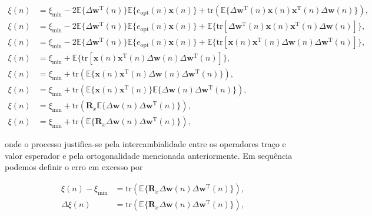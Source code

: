 \documentclass[a4paper,10pt]{article}
\begin{document}
\begin{enumerate}
\begin{enumerate}
						\begin{align}
							\xi(n) &= \xi_{\text{min}} - 2 \mathbb{E}\{\Delta \mathbf{w}^{\text{T}}(n)\} \mathbb{E}\{e_{\text{opt}}(n) \mathbf{x}(n)\} + \text{tr}(\mathbb{E}\{\Delta \mathbf{w}^{\text{T}}(n) \mathbf{x}(n) \mathbf{x}^{\text{T}}(n) \Delta \mathbf{w}(n)\}), \\
							\xi(n) &= \xi_{\text{min}} - 2 \mathbb{E}\{\Delta \mathbf{w}^{\text{T}}(n)\} \mathbb{E}\{e_{\text{opt}}(n)\mathbf{x}(n)\} + \mathbb{E}\{\text{tr}[\Delta \mathbf{w}^{\text{T}}(n) \mathbf{x}(n) \mathbf{x}^{\text{T}}(n) \Delta \mathbf{w}(n)]\}, \\
							\xi(n) &= \xi_{\text{min}} - 2 \mathbb{E}\{\Delta \mathbf{w}^{\text{T}}(n)\} \mathbb{E}\{e_{\text{opt}}(n)\mathbf{x}(n)\} + \mathbb{E}\{\text{tr}[\mathbf{x}(n) \mathbf{x}^{\text{T}}(n) \Delta \mathbf{w}(n) \Delta \mathbf{w}^{\text{T}}(n)]\}, \\
							\xi(n) &= \xi_{\text{min}} + \mathbb{E}\{\text{tr}[\mathbf{x}(n) \mathbf{x}^{\text{T}}(n) \Delta \mathbf{w}(n) \Delta \mathbf{w}^{\text{T}}(n)]\}, \\
							\xi(n) &= \xi_{\text{min}} + \text{tr}(\mathbb{E}\{\mathbf{x}(n) \mathbf{x}^{\text{T}}(n) \Delta \mathbf{w}(n) \Delta \mathbf{w}^{\text{T}}(n)\}), \\
							\xi(n) &= \xi_{\text{min}} + \text{tr}(\mathbb{E}\{\mathbf{x}(n) \mathbf{x}^{\text{T}}(n)\} \mathbb{E}\{\Delta \mathbf{w}(n) \Delta \mathbf{w}^{\text{T}}(n)\}), \\
							\xi(n) &= \xi_{\text{min}} + \text{tr}(\mathbf{R}_{x} \mathbb{E}\{\Delta \mathbf{w}(n) \Delta \mathbf{w}^{\text{T}}(n)\}), \\
							\xi(n) &= \xi_{\text{min}} + \text{tr}(\mathbb{E}\{\mathbf{R}_{x} \Delta \mathbf{w}(n) \Delta \mathbf{w}^{\text{T}}(n)\}), 
						\end{align}

						onde o processo justifica-se pela intercambialidade entre os operadores traço e valor esperador e pela ortogonalidade mencionada anteriormente. Em sequência podemos definir o erro em excesso por

						\begin{align}
							\xi(n) - \xi_{\text{min}} &= \text{tr}(\mathbb{E}\{\mathbf{R}_{x} \Delta \mathbf{w}(n) \Delta \mathbf{w}^{\text{T}}(n)\}), \\
							\Delta \xi(n) &= \text{tr}(\mathbb{E}\{\mathbf{R}_{x} \Delta \mathbf{w}(n) \Delta \mathbf{w}^{\text{T}}(n)\}), \label{excesso1}
						\end{align}


\end{enumerate}
\end{enumerate}
\end{document}
